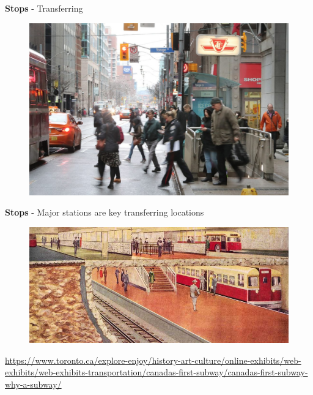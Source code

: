 \documentclass[aspectratio=169]{beamer}
\begin{document}
\begin{frame}
	
	\textbf{Stops} - Transferring
	
	\begin{figure}
		\centering
		\includegraphics[width=0.8\linewidth]{images/ttc_transfer.jpg}
	\end{figure}
	
\end{frame}








\begin{frame}
	
	\textbf{Stops} - Major stations are key transferring locations
	
	\begin{figure}
		\centering
		\includegraphics[width=0.98\linewidth]{images/eglinton_old_toronto.jpg}
	\end{figure}

	\tiny\url{https://www.toronto.ca/explore-enjoy/history-art-culture/online-exhibits/web-exhibits/web-exhibits-transportation/canadas-first-subway/canadas-first-subway-why-a-subway/}
	
\end{frame}
\end{document}
